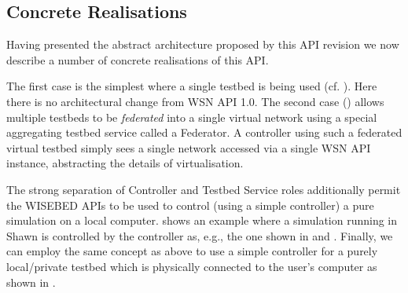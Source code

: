 	\subsection{Concrete Realisations}
	\label{ssec:arch-examples}
Having presented the abstract architecture proposed by this API revision we now describe a number of concrete realisations of this API.

The first case is the simplest where a single testbed is being used (cf. ). Here there is no architectural change from WSN API 1.0. The second case () allows multiple testbeds to be {\em federated} into a single virtual network using a special aggregating testbed service called a Federator. A controller using such a federated virtual testbed simply sees a single network accessed via a single WSN API instance, abstracting the details of virtualisation.

The strong separation of Controller and Testbed Service roles additionally permit the WISEBED APIs to be used to control (using a simple controller) a pure simulation on a local computer.  shows an example where a simulation running in Shawn is controlled by the controller as, e.g., the one shown in  and . Finally, we can employ the same concept as above to use a simple controller for a purely local/private testbed which is physically connected to the user's computer as shown in .


